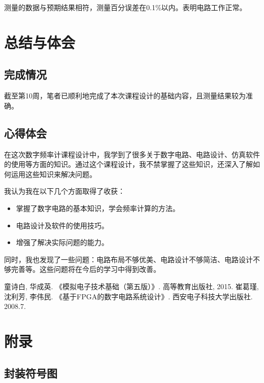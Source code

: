 \documentclass[12pt]{article}
\begin{document}
测量的数据与预期结果相符，测量百分误差在0.1\%以内。表明电路工作正常。

\newpage
\section{总结与体会}

\subsection{完成情况}

截至第10周，笔者已顺利地完成了本次课程设计的基础内容，且测量结果较为准确。

\subsection{心得体会}

在这次数字频率计课程设计中，我学到了很多关于数字电路、电路设计、仿真软件的使用等方面的知识。通过这个课程设计，我不禁掌握了这些知识，还深入了解如何运用这些知识来解决问题。

我认为我在以下几个方面取得了收获：

\begin{itemize}
    \item 掌握了数字电路的基本知识，学会频率计算的方法。
    \item 电路设计及软件的使用技巧。
    \item 增强了解决实际问题的能力。
\end{itemize}

同时，我也发现了一些问题：电路布局不够优美、电路设计不够简洁、电路设计不够完善等。这些问题将在今后的学习中得到改善。

\newpage
\nocite{*}

\begin{thebibliography}{99}

    童诗白, 华成英. 《模拟电子技术基础（第五版）》. 高等教育出版社, 2015.
    崔葛瑾, 沈利芳, 李伟民. 《基于FPGA的数字电路系统设计》. 西安电子科技大学出版社. 2008.7.

\end{thebibliography}

\newpage
\section*{附录}

\subsection*{封装符号图}
\end{document}
